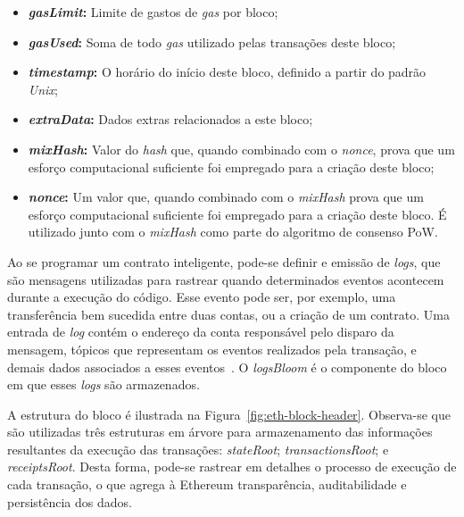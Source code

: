 \begin{itemize}
    \item \textbf{\textit{gasLimit}:} Limite de gastos de \textit{gas} por bloco;
    \item \textbf{\textit{gasUsed}:} Soma de todo \textit{gas} utilizado pelas transações deste bloco;
    \item \textbf{\textit{timestamp}:} O horário do início deste bloco, definido a partir do padrão \textit{Unix};
    \item \textbf{\textit{extraData}:} Dados extras relacionados a este bloco;
    \item \textbf{\textit{mixHash}:} Valor do \textit{hash} que, quando combinado com o \textit{nonce}, prova que um esforço computacional suficiente foi empregado para a criação deste bloco;
    \item \textbf{\textit{nonce}:} Um valor que, quando combinado com o \textit{mixHash} prova que um esforço computacional suficiente foi empregado para a criação deste bloco. É utilizado junto com o \textit{mixHash} como parte do algoritmo de consenso PoW.
\end{itemize}

Ao se programar um contrato inteligente, pode-se definir e emissão de  \textit{logs}, que são mensagens utilizadas para rastrear quando determinados eventos acontecem durante a execução do código. Esse evento pode ser, por exemplo, uma transferência bem sucedida entre duas contas, ou a criação de um contrato. Uma entrada de \textit{log} contém o endereço da conta responsável pelo disparo da mensagem, tópicos que representam os eventos realizados pela transação, e demais dados associados a esses eventos~\cite{solidity-v7.4-documentation}. O \textit{logsBloom} é o componente do bloco em que esses \textit{logs} são armazenados.

A estrutura do bloco é ilustrada na Figura~\ref{fig:eth-block-header}. Observa-se que são utilizadas três estruturas em árvore para armazenamento das informações resultantes da execução das transações: \textit{stateRoot}; \textit{transactionsRoot}; e \textit{receiptsRoot}. Desta forma, pode-se rastrear em detalhes o processo de execução de cada transação, o que agrega à Ethereum transparência, auditabilidade e persistência dos dados. 

